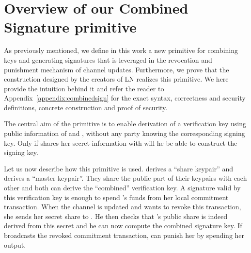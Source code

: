 \section{Overview of our Combined Signature primitive} 
  As previously mentioned, we define in this work a new primitive for combining
  keys and generating signatures that is leveraged in the revocation and
  punishment mechanism of channel updates. Furthermore, we prove that the
  construction designed by the creators of LN realizes this primitive. We here
  provide the intuition behind it and refer the reader to
  Appendix~\ref{appendix:combinedsign} for the exact syntax, correctness and
  security definitions, concrete construction and proof of security.

  The central aim of the primitive is to enable derivation of a verification key
  using public information of \alice{} and \bob, without any party knowing the
  corresponding signing key. Only if \alice{} shares her secret information with
  \bob{} will he be able to construct the signing key.

  Let us now describe how this primitive is used. \alice{} derives a ``share
  keypair'' and \bob{} derives a ``master keypair''. They share the public part
  of their keypairs with each other and both can derive the ``combined''
  verification key. A signature valid by this verification key is enough to
  spend \alice's funds from her local commitment transaction. When the channel
  is updated and \alice{} wants to revoke this transaction, she sends her secret
  share to \bob. He then checks that \alice's public share is indeed derived
  from this secret and he can now compute the combined signature key. If
  \alice{} broadcasts the revoked commitment transaction, \bob{} can punish her
  by spending her output.
